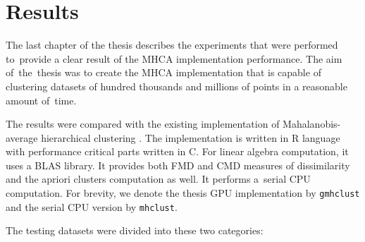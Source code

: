 \chapter{Results}

The last chapter of the thesis describes the experiments that were performed to~provide a clear result of the MHCA implementation performance. The aim of~the~thesis was to create the MHCA implementation that is capable of clustering datasets of hundred thousands and millions of points in a reasonable amount of~time.

The results were compared with the existing implementation of Mahalanobis-average hierarchical clustering \cite{fivser2012detection}. The implementation is written in R language with performance critical parts written in C. For linear algebra computation, it uses a BLAS library. It provides both FMD and CMD measures of dissimilarity and the apriori clusters computation as well. It performs a~serial CPU computation. For brevity, we denote the thesis GPU implementation by \texttt{gmhclust} and the serial CPU version by \texttt{mhclust}.

The testing datasets were divided into these two categories:

